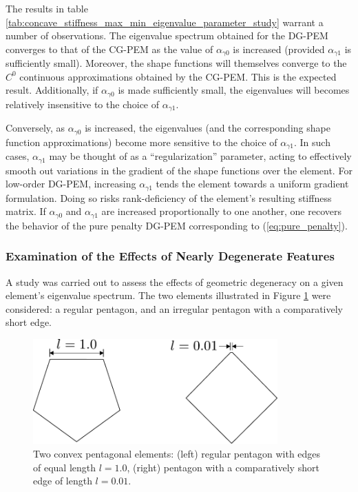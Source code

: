 The results in table \ref{tab:concave_stiffness_max_min_eigenvalue_parameter_study} warrant a number of observations. The eigenvalue spectrum obtained for the DG-PEM converges to that of the CG-PEM as the value of $\alpha_{\gamma0}$ is increased (provided $\alpha_{\gamma1}$ is sufficiently small). Moreover, the shape functions will themselves converge to the $C^0$ continuous approximations obtained by the CG-PEM. This is the expected result.
Additionally, if $\alpha_{\gamma0}$ is made sufficiently small, the eigenvalues will becomes relatively insensitive to the choice of $\alpha_{\gamma1}$. 

Conversely, as $\alpha_{\gamma0}$ is increased, the eigenvalues (and the corresponding shape function approximations) become more sensitive to the choice of $\alpha_{\gamma1}$. In such cases, $\alpha_{\gamma1}$ may be thought of as a ``regularization'' parameter, acting to effectively smooth out variations in the gradient of the shape functions over the element. For low-order DG-PEM, increasing $\alpha_{\gamma1}$ tends the element towards a uniform gradient formulation. Doing so risks rank-deficiency of the element's resulting stiffness matrix. If $\alpha_{\gamma0}$ and $\alpha_{\gamma1}$ are increased proportionally to one another, one recovers the behavior of the pure penalty DG-PEM corresponding to (\ref{eq:pure_penalty}).

\subsubsection*{Examination of the Effects of Nearly Degenerate Features}

A study was carried out to assess the effects of geometric degeneracy on a given element's eigenvalue spectrum. The two elements illustrated in Figure \ref{fig:degenerate_element_shapes} were considered: a regular pentagon, and an irregular pentagon with a comparatively short edge.

\begin{figure}[!h]
  \centering
  \includegraphics[width=3.7in]{figures/degenerate_element_shapes.pdf}  \caption{Two convex pentagonal elements: (left) regular pentagon with edges of equal length $l = 1.0$, (right) pentagon with a comparatively short edge of length $l = 0.01$.}
  \label{fig:degenerate_element_shapes}
\end{figure}

